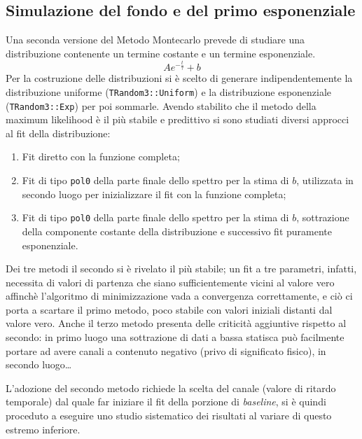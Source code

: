 \documentclass[10pt, oneside, a4paper]{article}   	%
\begin{document}
\subsection{Simulazione del fondo e del primo esponenziale}
Una seconda versione del Metodo Montecarlo prevede di studiare una distribuzione contenente un termine costante e un termine esponenziale. 
\[Ae^{-\frac{t}{\tau}}+b\]
Per la costruzione delle distribuzioni si è scelto di generare indipendentemente la distribuzione uniforme (\lstinline{TRandom3::Uniform}) e la distribuzione esponenziale (\lstinline{TRandom3::Exp}) per poi sommarle. Avendo stabilito che il metodo della maximum likelihood è il più stabile e predittivo si sono studiati diversi approcci al fit della distribuzione:
\begin{enumerate}
  \item Fit diretto con la funzione completa;
  \item Fit di tipo \lstinline{pol0} della parte finale dello spettro per la stima di $b$, utilizzata in secondo luogo per inizializzare il fit con la funzione completa;
  \item Fit di tipo \lstinline{pol0} della parte finale dello spettro per la stima di $b$, sottrazione della componente costante della distribuzione e successivo fit puramente esponenziale.
\end{enumerate}
Dei tre metodi il secondo si è rivelato il più stabile; un fit a tre parametri, infatti, necessita di valori di partenza che siano sufficientemente vicini al valore vero affinchè l'algoritmo di minimizzazione vada a convergenza correttamente, e ciò ci porta a scartare il primo metodo, poco stabile con valori iniziali distanti dal valore vero. Anche il terzo metodo presenta delle criticità aggiuntive rispetto al secondo: in primo luogo una sottrazione di dati a bassa statisca può facilmente portare ad avere canali a contenuto negativo (privo di significato fisico), in secondo luogo\dots

L'adozione del secondo metodo richiede la scelta del canale (valore di ritardo temporale) dal quale far iniziare il fit della porzione di \textit{baseline}, si è quindi proceduto a eseguire uno studio sistematico dei risultati al variare di questo estremo inferiore.
\begin{figure}

\end{figure}
%
%
\appendix


%
%
%
%
\end{document}
